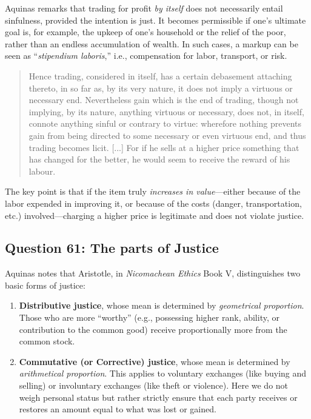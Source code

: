             Aquinas remarks that trading for profit \emph{by itself} does not necessarily entail sinfulness, provided the intention is just. It becomes permissible if one’s ultimate goal is, for example, the upkeep of one’s household or the relief of the poor, rather than an endless accumulation of wealth. In such cases, a markup can be seen as “\textit{stipendium laboris},” i.e., compensation for labor, transport, or risk.

            \begin{quote}
                Hence trading, considered in itself, has a certain debasement attaching thereto, in so far as, by its very nature, it does not imply a virtuous or necessary end. Nevertheless gain which is the end of trading, though not implying, by its nature, anything virtuous or necessary, does not, in itself, connote anything sinful or contrary to virtue: wherefore nothing prevents gain from being directed to some necessary or even virtuous end, and thus trading becomes licit. [...] For if he sells at a higher price something that has changed for the better, he would seem to receive the reward of his labour.
            \end{quote}

            The key point is that if the item truly \emph{increases in value}—either because of the labor expended in improving it, or because of the costs (danger, transportation, etc.) involved—charging a higher price is legitimate and does not violate justice.

    \subsection{Question 61: The parts of Justice}

        Aquinas notes that Aristotle, in \textit{Nicomachean Ethics} Book V, distinguishes two basic forms of justice:
        \begin{enumerate}
            \item \textbf{Distributive justice}, whose mean is determined by \emph{geometrical proportion}. Those who are more “worthy” (e.g., possessing higher rank, ability, or contribution to the common good) receive proportionally more from the common stock.
            \item \textbf{Commutative (or Corrective) justice}, whose mean is determined by \emph{arithmetical proportion}. This applies to voluntary exchanges (like buying and selling) or involuntary exchanges (like theft or violence). Here we do not weigh personal status but rather strictly ensure that each party receives or restores an amount equal to what was lost or gained.
        \end{enumerate}

